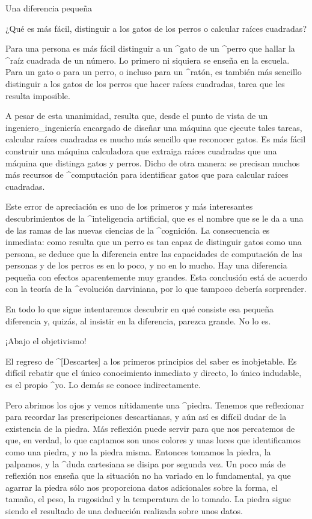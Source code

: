\Section Una diferencia pequeña

¿Qué es más fácil, distinguir a los gatos de los perros o calcular
raíces cuadradas?

Para una persona es más fácil distinguir a un ^{gato} de un ^{perro} que
hallar la ^{raíz cuadrada} de un número. Lo primero ni siquiera se
enseña en la escuela. Para un gato o para un perro, o incluso para un
^{ratón}, es también más sencillo distinguir a los gatos de los perros
que hacer raíces cuadradas, tarea que les resulta imposible.

A pesar de esta unanimidad, resulta que, desde el punto de vista de un
ingeniero_{ingeniería} encargado de diseñar una máquina que ejecute
tales tareas, calcular raíces cuadradas es mucho más sencillo que
reconocer gatos. Es más fácil construir una máquina calculadora que
extraiga raíces cuadradas que una máquina que distinga gatos y perros.
Dicho de otra manera: se precisan muchos más recursos de ^{computación}
para identificar gatos que para calcular raíces cuadradas.

Este error de apreciación es uno de los primeros y más interesantes
descubrimientos de la ^{inteligencia artificial}, que es el nombre que
se le da a una de las ramas de las nuevas ciencias de la ^{cognición}.
La consecuencia es inmediata: como resulta que un perro es tan capaz de
distinguir gatos como una persona, se deduce que la diferencia entre las
capacidades de computación de las personas y de los perros es en lo
poco, y no en lo mucho. Hay una diferencia pequeña con efectos
aparentemente muy grandes. Esta conclusión está de acuerdo con la teoría
de la ^{evolución} darviniana, por lo que tampoco debería sorprender.

En todo lo que sigue intentaremos descubrir en qué consiste esa pequeña
diferencia y, quizás, al insistir en la diferencia, parezca grande. No
lo es.


\Section ¡Abajo el objetivismo!

El regreso de ^[Descartes] a los primeros principios del saber es
inobjetable. Es difícil rebatir que el único conocimiento inmediato y
directo, lo único indudable, es el propio ^{yo}. Lo demás se conoce
indirectamente.

Pero abrimos los ojos y vemos nítidamente una ^{piedra}. Tenemos que
reflexionar para recordar las prescripciones descartianas, y aún así es
difícil dudar de la existencia de la piedra. Más reflexión puede servir
para que nos percatemos de que, en verdad, lo que captamos son unos
colores y unas luces que identificamos como una piedra, y no la piedra
misma. Entonces tomamos la piedra, la palpamos, y la ^{duda cartesiana}
se disipa por segunda vez. Un poco más de reflexión nos enseña que la
situación no ha variado en lo fundamental, ya que agarrar la piedra sólo
nos proporciona datos adicionales sobre la forma, el tamaño, el peso, la
rugosidad y la temperatura de lo tomado. La piedra sigue siendo el
resultado de una deducción realizada sobre unos datos.

